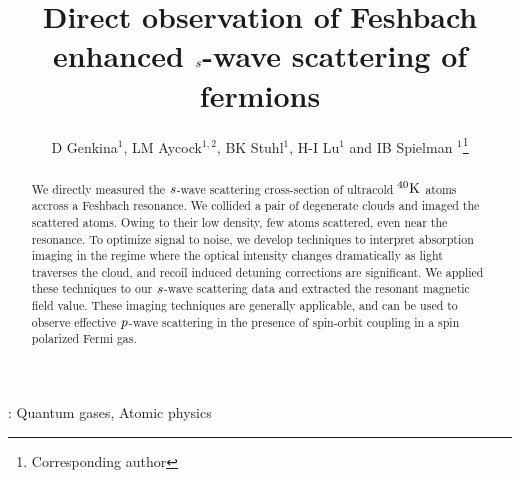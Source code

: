 \documentclass[12pt]{iopart}
\begin{document}
\newcommand{\swave}[0]{$\it{s}$-wave }
\newcommand{\pwave}[0]{$\it{p}$-wave }
\newcommand{\K}{ $^{40}\rm{K}$}
\newcommand{\Rb}{ $^{87}\rm{Rb}$}
\newcommand{\us}{$\mu \rm{s}$} 
\newcommand{\mT}{$m\rm{T}$}

\title[]{Direct observation of Feshbach enhanced \swave scattering of fermions}

\author{D Genkina$^1$, LM Aycock$^{1,2}$, BK Stuhl$^1$, H-I Lu$^1$ and IB Spielman
$^1$\footnote{Corresponding author}}

\address{$^1$Joint Quantum Institute, National Institute of Standards and Technology, and University of Maryland, Gaithersburg, MD, 20899 USA}
\address{$^2$Physics Department, Cornell University, Ithaca, NY 14850 USA}


\begin{abstract}
We directly measured the \swave{} scattering cross-section of ultracold \K{} atoms accross a Feshbach resonance. We collided a pair of degenerate clouds and imaged the scattered atoms. Owing to their low density, few atoms scattered, even near the resonance. To optimize signal to noise, we develop techniques to interpret absorption imaging in the regime where the optical intensity changes dramatically as light traverses the cloud, and recoil induced 
detuning corrections are significant. We applied these techniques to our \swave{} scattering data and extracted the resonant magnetic
field value. These imaging techniques are generally applicable, and can be used to observe effective \pwave{} scattering in the presence of spin-orbit coupling in a spin polarized  Fermi gas.

\end{abstract}

\vspace{2pc}
: Quantum gases, Atomic physics

\maketitle
\end{document}
